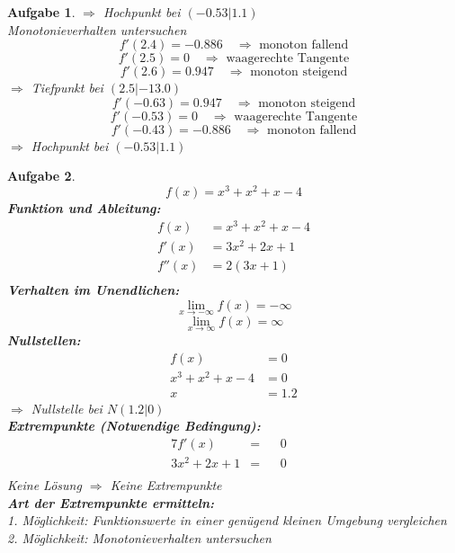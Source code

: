 \documentclass[12pt]{article}
\theoremstyle{note}
\newtheorem{aufgabe}{Aufgabe}
\begin{document}
\begin{flushleft}
\begin{aufgabe}
$\Rightarrow$ Hochpunkt bei $(-0.53|1.1)$ \\ 
\vspace{1em}{\em 2. M\"oglichkeit:} Monotonieverhalten untersuchen \\ 
$$f'(2.4)=-0.886\quad \Rightarrow \text{ monoton fallend} $$$$f'(2.5)=0 \quad \Rightarrow \text{ waagerechte Tangente} $$$$f'(2.6)=0.947\quad \Rightarrow \text{ monoton steigend} $$$\Rightarrow$ Tiefpunkt bei $(2.5|-13.0)$ \\ 
\vspace{1em}$$f'(-0.63)=0.947\quad \Rightarrow \text{ monoton steigend} $$$$f'(-0.53)=0 \quad \Rightarrow \text{ waagerechte Tangente} $$$$f'(-0.43)=-0.886\quad \Rightarrow \text{ monoton fallend} $$$\Rightarrow$ Hochpunkt bei $(-0.53|1.1)$ \\ 
\vspace{1em}
\end{aufgabe}\clearpage\begin{aufgabe} ~  
$$f(x)=x^{3} + x^{2} + x - 4$$ 
{\bf Funktion und Ableitung:} 
\begin{align*} 
f(x)&=x^{3} + x^{2} + x - 4\\ 
f'(x)&=3 x^{2} + 2 x + 1\\ 
f''(x)&=2 \left(3 x + 1\right)\\ 
\end{align*} 
{\bf Verhalten im Unendlichen:} 
\[ \lim_{x\rightarrow -\infty} f(x) =-\infty\]\[ \lim_{x\rightarrow\infty} f(x) =\infty\]{\bf Nullstellen:} 
\begin{align*} 
f(x)&=0 \\ 
x^{3} + x^{2} + x - 4&=0 \\ 
x&=1.2\end{align*} 
$\Rightarrow$ Nullstelle bei $N(1.2|0)$ \\ 
{\bf Extrempunkte (Notwendige Bedingung):} 
\begin{alignat*}{7} 
f'(x)&=& &0& \\ 
3 x^{2} + 2 x + 1&=& &0& \\ 
\end{alignat*} 
Keine L\"osung $\Rightarrow$ Keine Extrempunkte \\ 
{\bf Art der Extrempunkte ermitteln:} \\[1em] 
{\em 1. M\"oglichkeit:} Funktionswerte in einer gen\"ugend kleinen Umgebung vergleichen \\ 
{\em 2. M\"oglichkeit:} Monotonieverhalten untersuchen \\ 

\end{aufgabe}\clearpage
\end{flushleft} 
\end{document}
